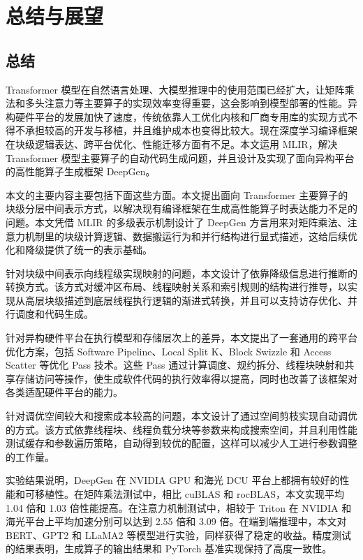 
\chapter{总结与展望}

\section{总结}

Transformer 模型在自然语言处理、大模型推理中的使用范围已经扩大，让矩阵乘法和多头注意力等主要算子的实现效率变得重要，这会影响到模型部署的性能。异构硬件平台的发展加快了速度，传统依靠人工优化内核和厂商专用库的实现方式不得不承担较高的开发与移植，并且维护成本也变得比较大。现在深度学习编译框架在块级逻辑表达、跨平台优化、性能迁移方面有不足。本文运用 MLIR，解决 Transformer 模型主要算子的自动代码生成问题，并且设计及实现了面向异构平台的高性能算子生成框架 DeepGen。

本文的主要内容主要包括下面这些方面。本文提出面向 Transformer 主要算子的块级分层中间表示方式，以解决现有编译框架在生成高性能算子时表达能力不足的问题。本文凭借 MLIR 的多级表示机制设计了 DeepGen 方言用来对矩阵乘法、注意力机制里的块级计算逻辑、数据搬运行为和并行结构进行显式描述，这给后续优化和降级提供了统一的表示基础。

针对块级中间表示向线程级实现映射的问题，本文设计了依靠降级信息进行推断的转换方式。该方式对缓冲区布局、线程映射关系和索引规则的结构进行推导，以实现从高层块级描述到底层线程执行逻辑的渐进式转换，并且可以支持访存优化、并行调度和代码生成。

针对异构硬件平台在执行模型和存储层次上的差异，本文提出了一套通用的跨平台优化方案，包括 Software Pipeline、Local Split K、Block Swizzle 和 Access Scatter 等优化 Pass 技术。这些 Pass 通过计算调度、规约拆分、线程块映射和共享存储访问等操作，使生成软件代码的执行效率得以提高，同时也改善了该框架对各类适配硬件平台的能力。

针对调优空间较大和搜索成本较高的问题，本文设计了通过空间剪枝实现自动调优的方式。该方式依靠线程块、线程负载分块等参数来构成搜索空间，并且利用性能测试缓存和参数遍历策略，自动得到较优的配置，这样可以减少人工进行参数调整的工作量。

实验结果说明，DeepGen 在 NVIDIA GPU 和海光 DCU 平台上都拥有较好的性能和可移植性。在矩阵乘法测试中，相比 cuBLAS 和 rocBLAS，本文实现平均 1.04 倍和 1.03 倍性能提高。在注意力机制测试中，相较于 Triton 在 NVIDIA 和海光平台上平均加速分别可以达到 2.55 倍和 3.09 倍。在端到端推理中，本文对 BERT、GPT2 和 LLaMA2 等模型进行实验，同样获得了稳定的收益。精度测试的结果表明，生成算子的输出结果和 PyTorch 基准实现保持了高度一致性。

